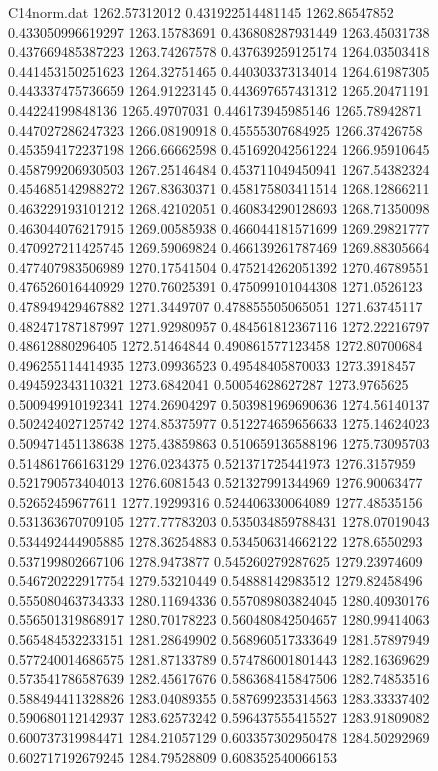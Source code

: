 \begin{filecontents}{C14norm.dat}
1262.57312012			0.431922514481145
1262.86547852			0.433050996619297
1263.15783691			0.436808287931449
1263.45031738			0.437669485387223
1263.74267578			0.437639259125174
1264.03503418			0.441453150251623
1264.32751465			0.440303373134014
1264.61987305			0.443337475736659
1264.91223145			0.443697657431312
1265.20471191			0.44224199848136
1265.49707031			0.446173945985146
1265.78942871			0.447027286247323
1266.08190918			0.45555307684925
1266.37426758			0.453594172237198
1266.66662598			0.451692042561224
1266.95910645			0.458799206930503
1267.25146484			0.453711049450941
1267.54382324			0.454685142988272
1267.83630371			0.458175803411514
1268.12866211			0.463229193101212
1268.42102051			0.460834290128693
1268.71350098			0.463044076217915
1269.00585938			0.466044181571699
1269.29821777			0.470927211425745
1269.59069824			0.466139261787469
1269.88305664			0.477407983506989
1270.17541504			0.475214262051392
1270.46789551			0.476526016440929
1270.76025391			0.475099101044308
1271.0526123			0.478949429467882
1271.3449707			0.478855505065051
1271.63745117			0.482471787187997
1271.92980957			0.484561812367116
1272.22216797			0.48612880296405
1272.51464844			0.490861577123458
1272.80700684			0.496255114414935
1273.09936523			0.49548405870033
1273.3918457			0.494592343110321
1273.6842041			0.50054628627287
1273.9765625			0.500949910192341
1274.26904297			0.503981969690636
1274.56140137			0.502424027125742
1274.85375977			0.512274659656633
1275.14624023			0.509471451138638
1275.43859863			0.510659136588196
1275.73095703			0.514861766163129
1276.0234375			0.521371725441973
1276.3157959			0.521790573404013
1276.6081543			0.521327991344969
1276.90063477			0.52652459677611
1277.19299316			0.524406330064089
1277.48535156			0.531363670709105
1277.77783203			0.535034859788431
1278.07019043			0.534492444905885
1278.36254883			0.534506314662122
1278.6550293			0.537199802667106
1278.9473877			0.545260279287625
1279.23974609			0.546720222917754
1279.53210449			0.54888142983512
1279.82458496			0.555080463734333
1280.11694336			0.557089803824045
1280.40930176			0.556501319868917
1280.70178223			0.560480842504657
1280.99414063			0.565484532233151
1281.28649902			0.568960517333649
1281.57897949			0.577240014686575
1281.87133789			0.574786001801443
1282.16369629			0.573541786587639
1282.45617676			0.586368415847506
1282.74853516			0.588494411328826
1283.04089355			0.587699235314563
1283.33337402			0.590680112142937
1283.62573242			0.596437555415527
1283.91809082			0.600737319984471
1284.21057129			0.603357302950478
1284.50292969			0.602717192679245
1284.79528809			0.608352540066153

\end{filecontents}
